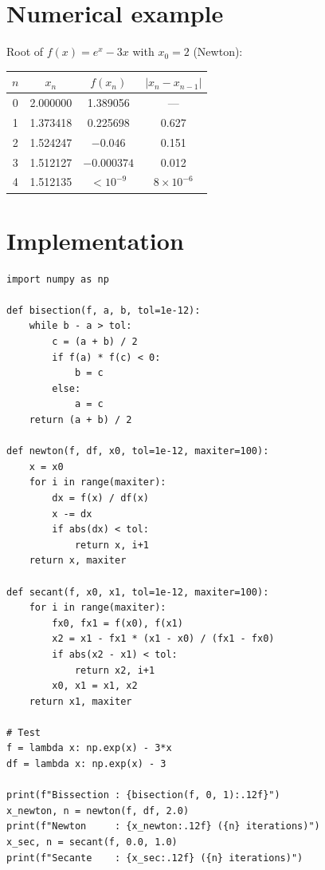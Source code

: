 \section{Numerical example}

Root of $f(x)=e^x-3x$ with $x_0=2$ (Newton):
\begin{center}
\begin{tabular}{cccc}
\toprule
$n$ & $x_n$ & $f(x_n)$ & $|x_n-x_{n-1}|$ \\
\midrule
0 & 2.000000 & 1.389056 & --- \\
1 & 1.373418 & 0.225698 & 0.627 \\
2 & 1.524247 & $-0.046$ & 0.151 \\
3 & 1.512127 & $-0.000374$ & 0.012 \\
4 & 1.512135 & $<10^{-9}$ & $8\times10^{-6}$ \\
\bottomrule
\end{tabular}
\end{center}

\section{Implementation}

\begin{codeblock}[title=\textbf{Python}]
\begin{verbatim}
import numpy as np

def bisection(f, a, b, tol=1e-12):
    while b - a > tol:
        c = (a + b) / 2
        if f(a) * f(c) < 0:
            b = c
        else:
            a = c
    return (a + b) / 2

def newton(f, df, x0, tol=1e-12, maxiter=100):
    x = x0
    for i in range(maxiter):
        dx = f(x) / df(x)
        x -= dx
        if abs(dx) < tol:
            return x, i+1
    return x, maxiter

def secant(f, x0, x1, tol=1e-12, maxiter=100):
    for i in range(maxiter):
        fx0, fx1 = f(x0), f(x1)
        x2 = x1 - fx1 * (x1 - x0) / (fx1 - fx0)
        if abs(x2 - x1) < tol:
            return x2, i+1
        x0, x1 = x1, x2
    return x1, maxiter

# Test
f = lambda x: np.exp(x) - 3*x
df = lambda x: np.exp(x) - 3

print(f"Bissection : {bisection(f, 0, 1):.12f}")
x_newton, n = newton(f, df, 2.0)
print(f"Newton     : {x_newton:.12f} ({n} iterations)")
x_sec, n = secant(f, 0.0, 1.0)
print(f"Secante    : {x_sec:.12f} ({n} iterations)")
\end{verbatim}
\end{codeblock}

